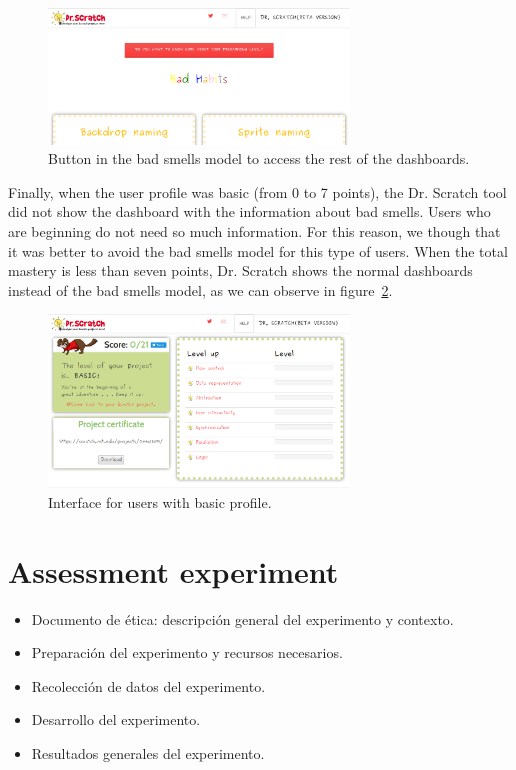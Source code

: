 \begin{figure}
    \centering
    \includegraphics[width=8cm,                         keepaspectratio]{img/button.png}
    \caption{Button in the bad smells model to access the rest of the dashboards.}
    \label{fig:button}
\end{figure}

Finally, when the user profile was basic (from 0 to 7 points), the Dr. Scratch tool did not show the dashboard with the information about bad smells. Users who are beginning do not need so much information. For this reason, we though that it was better to avoid the bad smells model for this type of users. When the total mastery is less than seven points, Dr. Scratch shows the normal dashboards instead of the bad smells model, as we can observe in figure~\ref{fig:basic_level}.

\begin{figure}
    \centering
    \includegraphics[width=8cm,                         keepaspectratio]{img/basic_level.png}
    \caption{Interface for users with basic profile.}
    \label{fig:basic_level}
\end{figure}


\section{Assessment experiment}
\label{sec:experiment}

\begin{itemize}
    \item Documento de ética: descripción general del experimento y contexto.
    \item Preparación del experimento y recursos necesarios.
    \item Recolección de datos del experimento.
    \item Desarrollo del experimento.
    \item Resultados generales del experimento.
\end{itemize}
